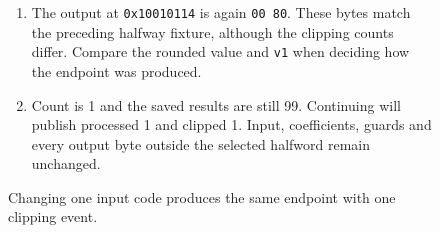 \begin{figure}[htbp]
\begin{minipage}{\linewidth}
\begin{enumerate}
      \item The output at \texttt{0x10010114} is again \texttt{00 80}. These bytes match the preceding halfway fixture, although the clipping counts differ. Compare the rounded value and \texttt{v1} when deciding how the endpoint was produced.
      \item Count is 1 and the saved results are still 99. Continuing will publish processed 1 and clipped 1. Input, coefficients, guards and every output byte outside the selected halfword remain unchanged.
    \end{enumerate}
  \end{minipage}
  \caption{Changing one input code produces the same endpoint with one clipping event.}
  \label{capture:021-fixed-point-fir-f04}
  \label{fir-f04}
\end{figure}
\par
